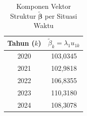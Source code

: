 \begin{table}[H]
\centering
\small
\caption{Komponen Vektor Struktur $\tilde{\boldsymbol{\beta}}$ per Situasi Waktu} \label{tab:beta_vec}
\begin{tabular}{|c|c|}
\hline
\textbf{Tahun ($k$)} & \textbf{$\tilde{\beta}_k = \lambda_1 u_{1k}$} \\
\hline
2020 & 103,0345 \\
2021 & 102,9818 \\
2022 & 106,8355 \\
2023 & 110,3180 \\
2024 & 108,3078 \\
\hline
\end{tabular}
\end{table}